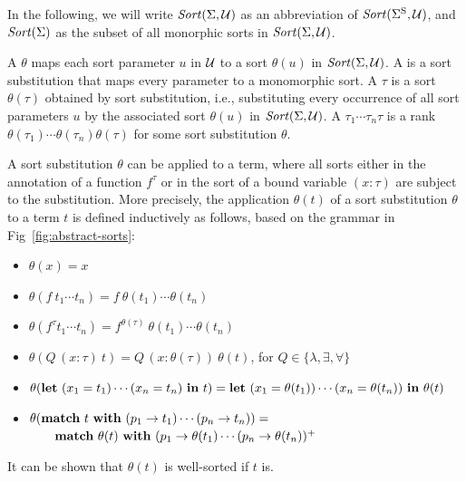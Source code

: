 \begin{notation}
In the following, we will write $\mathit{Sort}(\Sigma, \mathcal{U})$ as an abbreviation 
of $\mathit{Sort}(\Sigma^\mathrm{S}, \mathcal{U})$, and $\mathit{Sort}(\Sigma)$ as the subset of all 
monorphic sorts in $\mathit{Sort}(\Sigma, \mathcal{U})$.
\end{notation}

\begin{definition}
A  $\theta$
maps each sort parameter $u$ in $\mathcal{U}$ to a sort $\theta(u)$ in $\mathit{Sort}(\Sigma,\mathcal{U})$.
A  is a sort substitution that maps every parameter
to a monomorphic sort.
A  $\tau$ is a sort $\theta(\tau)$ obtained
by sort substitution, i.e.,
substituting every occurrence of all sort parameters $u$ by the associated sort
$\theta(u)$ in $\mathit{Sort}(\Sigma,\mathcal{U})$.
A  $\tau_1\cdots\tau_n \tau$ is a rank
$\theta(\tau_1)\cdots\theta(\tau_n)\theta(\tau)$ for some sort substitution
$\theta$.
\end{definition}

A sort substitution $\theta$ can be applied to a term, where all sorts either in the annotation of a function $f^\tau$ or in the sort of a bound variable $(x:\tau)$ are subject to the substitution.  More precisely, the application $\theta(t)$ of a sort substitution $\theta$ to a term $t$ is defined inductively as follows, based on the grammar in Fig~\ref{fig:abstract-sorts}:
\begin{itemize}
\item $\theta(x)=x$
\item $\theta(f\ t_1 \cdots t_n) = f\ \theta(t_1) \cdots \theta(t_n)$
\item $\theta(f^\tau t_1 \cdots t_n) = f^{\theta(\tau)}\ \theta(t_1) \cdots \theta(t_n)$
\item $\theta(Q\, (x{:}\tau)\ t) = Q\, (x{:} \theta(\tau))\  \theta(t)$, for $Q\in \{\lambda, \exists, \forall\}$
\item $\theta(\akey{let}\ (x_1 = t_1) \cdots (x_n = t_n)\ \akey{in}\ t) = 
\akey{let}\ (x_1 = \theta(t_1)) \cdots (x_n = \theta(t_n))\ \akey{in}\ \theta(t)$
\item $\theta(\akey{match}\ t\ \akey{with}\ (p_1 \to t_1) \cdots (p_n \to t_n)) =$\\
  $\quad \quad \akey{match}\ \theta(t)\ \akey{with}\ (p_1 \to \theta(t_1) \cdots (p_n \to \theta(t_n))^+$
\end{itemize}
It can be shown that $\theta(t)$ is well-sorted if $t$ is.

